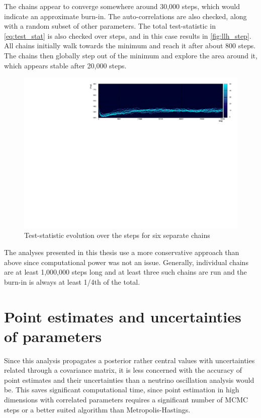 The chains appear to converge somewhere around 30,000 steps, which would indicate an approximate burn-in. The auto-correlations are also checked, along with a random subset of other parameters. The total test-statistic in \autoref{eq:test_stat} is also checked over steps, and in this case results in \autoref{fig:llh_step}. All chains initially walk towards the minimum and reach it after about 800 steps. The chains then globally step out of the minimum and explore the area around it, which appears stable after 20,000 steps.
\begin{figure}[h]
	\includegraphics[width=\textwidth, trim={0mm 0mm 0mm 0mm}, clip,page=1]{figures/mcmc/logl_step0}
	\caption{Test-statistic evolution over the steps for six separate chains}
	\label{fig:llh_step}
\end{figure}

The analyses presented in this thesis use a more conservative approach than above since computational power was not an issue. Generally, individual chains are at least 1,000,000 steps long and at least three such chains are run and the burn-in is always at least 1/4th of the total.

\section{Point estimates and uncertainties of parameters}
Since this analysis propagates a posterior rather central values with uncertainties related through a covariance matrix, it is less concerned with the accuracy of point estimates and their uncertainties than a neutrino oscillation analysis would be. This saves significant computational time, since point estimation in high dimensions with correlated parameters requires a significant number of MCMC steps or a better suited algorithm than Metropolis-Hastings.

